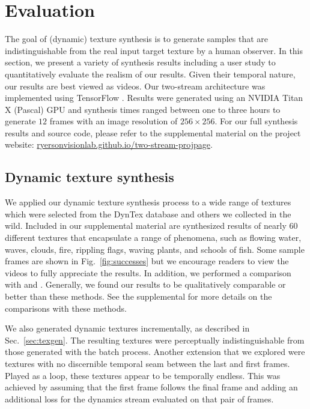 \chapter{Evaluation }\label{chap:evaluation}



The goal of (dynamic) texture synthesis is to generate 
samples that are indistinguishable from the real input target
texture by a human observer.
In this section, we present a variety of synthesis results
including a user study to quantitatively evaluate the realism
of our results.
Given their temporal nature, our results are best viewed as 
videos.
Our two-stream architecture was implemented using TensorFlow
\cite{tabadi2015tensorflowlong}.
Results were generated using an NVIDIA Titan X (Pascal) GPU
and synthesis times ranged between one to three hours 
to generate $12$ frames with an image resolution of 
$256 \times 256$.
For our full synthesis results and source code, please refer to the
supplemental material on the project website: \url{ryersonvisionlab.github.io/two-stream-projpage}.

\section{Dynamic texture synthesis}\label{eval_dynamictexturesynthesis}

We applied our dynamic texture synthesis process 
to a wide range of textures which were selected from the 
DynTex \cite{peteri2010} database and others we collected in
the wild.
Included in our supplemental material are synthesized results
of nearly 60 different textures that encapsulate a range of
phenomena, such as flowing water, waves, clouds, fire, rippling
flags, waving plants, and schools of fish.
Some sample frames are shown in Fig.\ \ref{fig:successes}
but we encourage readers to view the videos to fully appreciate
the results.
In addition, we performed a comparison with \cite{funke2017} and 
\cite{xie2017synthesizing}.
Generally, we found our results to be qualitatively comparable or better than
these methods.
See the supplemental for more details on the comparisons with these methods.

We also generated dynamic textures incrementally, as described in
Sec.\ \ref{sec:texgen}.
The resulting textures were perceptually indistinguishable from those
generated with the batch process.
Another extension that we explored were textures with no 
discernible temporal seam between the last and first frames.
Played as a loop, these textures appear to be temporally endless.
This was achieved by assuming that the first frame follows the
final frame and adding an additional loss for the dynamics 
stream evaluated on that pair of frames.

